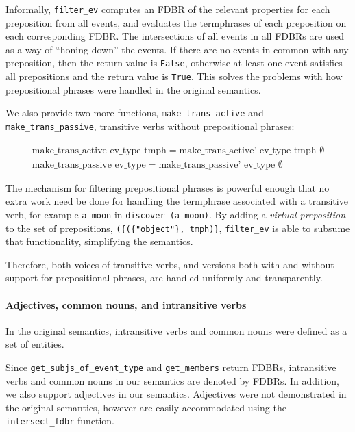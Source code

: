 \documentclass[../main.tex]{subfiles}
\begin{document}
Informally, \texttt{filter\_ev} computes an FDBR of the relevant properties for
each preposition from all events, and evaluates the termphrases of each
preposition on each corresponding FDBR.  The intersections of all events in all
FDBRs are used as a way
of ``honing down'' the events.  If there are no events in common with any
preposition, then the return value is \texttt{False}, otherwise at least
one event satisfies all prepositions and the return value is \texttt{True}.
This solves the problems with how prepositional phrases were handled in the
original semantics.

We also provide two more functions, \texttt{make\_trans\_active} and \texttt{make\_trans\_passive}, transitive verbs without prepositional phrases:

\begin{gather*}
\text{make\_trans\_active ev\_type tmph} = \text{make\_trans\_active' ev\_type tmph }\emptyset\\
\text{make\_trans\_passive ev\_type} = \text{make\_trans\_passive' ev\_type }\emptyset
\end{gather*}

The mechanism for filtering prepositional phrases is powerful enough that no extra work need be done for handling the termphrase associated with a transitive verb, for example
\texttt{a moon} in \texttt{discover (a moon)}.  By adding a {\em
virtual preposition} to the set of prepositions, \texttt{(\{(\{"object"\},
tmph)\}}, \texttt{filter\_ev} is able to subsume that functionality, simplifying
the semantics.

Therefore, both voices of transitive verbs, and versions both with and without support for prepositional phrases, are handled uniformly and transparently.

\paragraph{Adjectives, common nouns, and intransitive verbs}

In the original semantics, intransitive verbs and common nouns were defined as a set of entities.

Since \texttt{get\_subjs\_of\_event\_type} and \texttt{get\_members} return
FDBRs, intransitive verbs and common nouns in our semantics are denoted by FDBRs.
In addition, we also support adjectives in our semantics. 
Adjectives were not demonstrated in the original semantics, however are easily accommodated using the \texttt{intersect\_fdbr} function.
\end{document}
